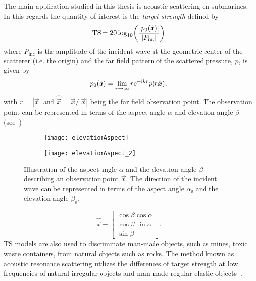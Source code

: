 The main application studied in this thesis is acoustic scattering on submarines. In this regards the quantity of interest is the \textit{target strength} defined by
\begin{equation}\label{Eq:TS}
	\TS = 20\log_{10}\left(\frac{|p_0(\hat{\vec{x}})|}{|P_{\mathrm{inc}}|}\right)
\end{equation}
where $P_{\mathrm{inc}}$ is the amplitude of the incident wave at the geometric center of the scatterer (i.e. the origin) and the far field pattern of the scattered pressure, $p$, is given by
\begin{equation}\label{Eq:farfield}
	p_0(\hat{\vec{x}}) =  \lim_{r\to\infty} r \euler^{-\imag k r}p(r\hat{\vec{x}}),
\end{equation}
with $r = |\vec{x}|$ and $\hat{\vec{x}} = \vec{x}/|\vec{x}|$ being the far field observation point. The observation point can be represented in terms of the aspect angle $\alpha$ and elevation angle $\beta$ (see~)
\begin{figure}
	\centering
	\begin{subfigure}[t]{0.49\textwidth}
		\centering
		\texttt{[image: elevationAspect]}
	\end{subfigure}%
	\hspace*{0.02\textwidth}%
	\begin{subfigure}[t]{0.49\textwidth}
		\centering
		\texttt{[image: elevationAspect\_2]}
	\end{subfigure}
	\caption{Illustration of the aspect angle $\alpha$ and the elevation angle $\beta$ describing an observation point $\vec{x}$. The direction of the incident wave can be represented in terms of the aspect angle $\alpha_{\mathrm{s}}$ and the elevation angle $\beta_{\mathrm{s}}$.}
	\label{Fig:elevationAspect}
\end{figure}
\begin{equation*}
	\hat{\vec{x}} = \begin{bmatrix}
		\cos\beta\cos\alpha\\
		\cos\beta\sin\alpha\\
		\sin\beta
	\end{bmatrix}.
\end{equation*}
TS models are also used to discriminate man-made objects, such as mines, toxic waste containers, from natural objects such as rocks. The method known as acoustic resonance scattering utilizes the differences of target strength at low frequencies of natural irregular objects and man-made regular elastic objects~\cite{Zampolli2007bsf,Zampolli2012ltm}. 
\newpage
